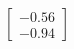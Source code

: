 \documentclass[preview]{standalone}
\begin{document}
\begin{align*}
\begin{bmatrix} -0.56 \\ -0.94 \end{bmatrix}
\end{align*}
\end{document}
